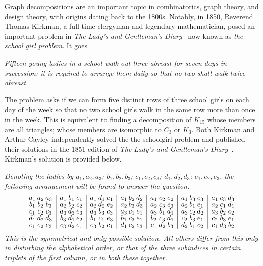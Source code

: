 \newpage Graph decompositions are an important topic in combinatorics, graph theory, and design theory, with origins dating back to the 1800s. Notably, in 1850, Reverend Thomas Kirkman, a full-time clergyman and legendary mathematician, posed an important problem in \textit{The Lady's and Gentleman's Diary}~\cite{Kirkman1850} now known as \textit{the school girl problem}. It goes

\begin{center}
\begin{minipage}{0.7\textwidth}
  \centering\itshape
  Fifteen young ladies in a school walk out three abreast for seven days in succession: it is required to arrange them daily so that no two shall walk twice abreast.
\end{minipage}
\end{center}

The problem asks if we can form five distinct rows of three school girls on each day of the week so that no two school girls walk in the same row more than once in the week. This is equivalent to finding a decomposition of $K_{15}$ whose members are all triangles; whose members are isomorphic to $C_{3}$ or $K_{3}$. Both Kirkman and Arthur Cayley independently solved the the schoolgirl problem and published their solutions in the 1851 edition of \textit{The Lady's and Gentleman's Diary}~\cite{Kirkman1851}. Kirkman's solution is provided below.

  \vspace{1em}
  \itshape
  \noindent Denoting the ladies by $a_1, a_2, a_3$; $b_1, b_2, b_3$; $c_1, c_2, c_3$; $d_1, d_2, d_3$; $e_1, e_2, e_3$, the following arrangement will be found to answer the question:
\[
\renewcommand{\arraystretch}{0.7}
\begin{array}{
  @{}c@{\hskip 2pt}c@{\hskip 2pt}c
  |c@{\hskip 2pt}c@{\hskip 2pt}c
  |c@{\hskip 2pt}c@{\hskip 2pt}c
  |c@{\hskip 2pt}c@{\hskip 2pt}c
  |c@{\hskip 2pt}c@{\hskip 2pt}c
  |c@{\hskip 2pt}c@{\hskip 2pt}c
  |c@{\hskip 2pt}c@{\hskip 2pt}c@{}}
a_1 & a_2 & a_3 & a_1 & b_1 & c_1 & a_1 & d_1 & e_1 & a_1 & b_2 & d_2 & a_1 & c_2 & e_2 & a_1 & b_3 & e_3 & a_1 & c_3 & d_3 \\
b_1 & b_2 & b_3 & a_2 & b_2 & c_2 & a_2 & d_2 & e_2 & a_2 & b_3 & d_3 & a_2 & c_3 & e_3 & a_2 & b_1 & e_1 & a_2 & c_1 & d_1 \\
c_1 & c_2 & c_3 & a_3 & d_3 & e_3 & a_3 & b_3 & c_3 & a_3 & c_1 & e_1 & a_3 & b_1 & d_1 & a_3 & c_2 & d_2 & a_3 & b_2 & e_2 \\
d_1 & d_2 & d_3 & b_3 & d_1 & e_2 & b_1 & c_1 & e_3 & b_1 & c_3 & e_1 & b_2 & c_3 & d_1 & c_2 & b_3 & e_1 & c_2 & b_3 & e_1 \\
e_1 & e_2 & e_3 & c_3 & d_2 & e_1 & e_3 & b_2 & c_1 & d_1 & c_2 & e_3 & c_1 & d_2 & b_3 & d_2 & b_1 & c_2 & c_1 & d_3 & b_2 \\
\end{array}
\]
\noindent This is the symmetrical and only possible solution. All others differ from this only in disturbing the alphabetical order, or that of the three subindices in certain triplets of the first column, or in both these together.\newline

